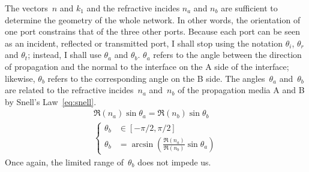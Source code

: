 The vectors~$n$ and $k_1$ and the refractive incides $n_a$ and $n_b$ are sufficient to determine the geometry of the whole network.
In other words, the orientation of one port constrains that of the three other ports.
Because each port can be seen as an incident, reflected or transmitted port, I shall stop using the notation $\theta_i$, $\theta_r$ and $\theta_t$;
instead, I shall use $\theta_a$ and $\theta_b$.
$\theta_a$ refers to the angle between the direction of propagation and the normal to the interface on the A side of the interface;
likewise, $\theta_b$ refers to the corresponding angle on the B side.
The angles~$\theta_a$ and~$\theta_b$ are related to the refractive incides~$n_a$ and~$n_b$ of the propagation media A and B by Snell's Law~\eqref{eq:snell}.
\begin{gather}
    \Re(n_a) \sin \theta_a = \Re(n_b) \sin \theta_b
    \label{eq:snell}
    \\
    \left\lbrace
        \begin{aligned}
            \theta_b &\in [-\pi/2, \pi/2]
            \\
            \theta_b &= \arcsin
            \left(
                \frac{\Re(n_a)}{\Re(n_b)}
                \sin \theta_a
            \right)
        \end{aligned}
    \right.
    \label{eq:snell_thetab}
\end{gather}
Once again, the limited range of~$\theta_b$ does not impede us.

